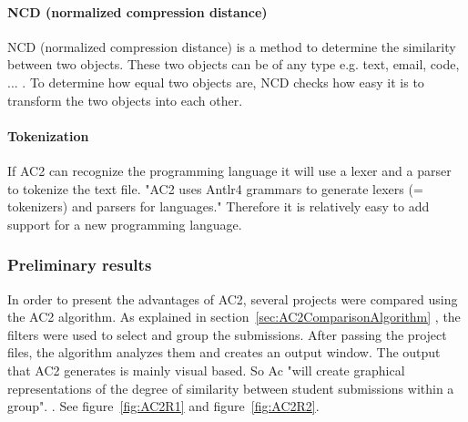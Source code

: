 \documentclass[a4paper, 11pt]{article}
\renewcommand{\\}{\vspace*{0.5\baselineskip} \newline}
\begin{document}
\paragraph{NCD (normalized compression distance)}
\label{sec:NCD}

NCD (normalized compression distance) is a method to determine the similarity between two objects. These two objects can be of any type e.g. text, email, code, ... .  To determine how equal two objects are, NCD checks how easy it is to transform the two objects into each other.

\paragraph{Tokenization}

If AC2 can recognize the programming language it will use a lexer and a parser to tokenize the text file. "AC2 uses Antlr4 grammars to generate lexers (= tokenizers) and parsers for languages." \autocite{AC2wiki} Therefore it is relatively easy to add support for a new programming language.

\subsubsection{Preliminary results}

In order to present the advantages of AC2, several projects were compared using the AC2 algorithm. As explained in section~\ref{sec:AC2ComparisonAlgorithm} , the filters were used to select and group the submissions. After passing the project files, the algorithm analyzes them and creates an output window. The output that AC2 generates is mainly visual based. So Ac "will create graphical representations of the degree of similarity between student submissions within a group". \autocite{AC2}. See figure~\ref{fig:AC2R1} and figure~\ref{fig:AC2R2}.
\end{document}
